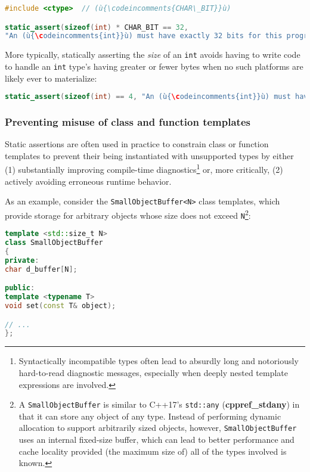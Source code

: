 \begin{lstlisting}[language=C++]
#include <ctype>  // (ù{\codeincomments{CHAR\_BIT}}ù)

static_assert(sizeof(int) * CHAR_BIT == 32,
"An (ù{\codeincomments{int}}ù) must have exactly 32 bits for this program to work correctly.");
\end{lstlisting}

\noindent More typically, statically asserting the \emph{size} of an \texttt{int}
avoids having to write code to handle an \texttt{int} type's having
greater or fewer bytes when no such platforms are likely ever to
materialize:

\begin{lstlisting}[language=C++]
static_assert(sizeof(int) == 4, "An (ù{\codeincomments{int}}ù) must have exactly 4 bytes.");
\end{lstlisting}


\subsubsection[Preventing misuse of class and function templates]{Preventing misuse of class and function templates}\label{preventing-misuse-of-class-and-function-templates}

Static assertions are often used in practice to constrain class or
function templates to prevent their being instantiated with unsupported
types by either (1) substantially improving compile-time
diagnostics{\cprotect\footnote{Syntactically incompatible types often
lead to absurdly long and notoriously hard-to-read diagnostic messages, especially when deeply nested template expressions are involved.}} or, more critically, (2) actively avoiding
erroneous runtime behavior.

As an example, consider the \texttt{SmallObjectBuffer<N>} class
templates, which provide storage for arbitrary objects whose size does
not exceed \texttt{N}{\cprotect\footnote{A \texttt{SmallObjectBuffer} is
similar to C++17's \texttt{std::any} (\textbf{{cppref\_stdany}}) in
that it can store any object of any type. Instead of performing
dynamic allocation to support arbitrarily sized objects, however,
\texttt{SmallObjectBuffer} uses an internal fixed-size buffer, which
can lead to better performance and cache locality provided (the
maximum size of) all of the types involved is known.}}:

\begin{lstlisting}[language=C++]
template <std::size_t N>
class SmallObjectBuffer
{
private:
char d_buffer[N];

public:
template <typename T>
void set(const T& object);

// ...
};
\end{lstlisting}

